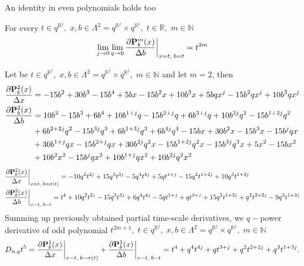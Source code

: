 An identity in even polynomials holds too
\begin{cor}
    For every $t\in q^{\mathbb{R}^j}, \; x,b\in\Lambda^2 = q^{\mathbb{R}^j} \times q^{\mathbb{R}^j}, \; t\in\mathbb{R}, \; m\in\mathbb{N}$
    \[
        \lim \limits_{j \to 0} \lim \limits_{q \to 0} \frac{\partial {\mathbf{P}}\sp{m} \sb{b}(x)}{\Delta b} \bigg |_{x = t, \; b = t}
        = t^{2m}
    \]
\end{cor}

\begin{examp}
    Let be $t\in q^{\mathbb{R}^j}, \; x,b\in\Lambda^2 = q^{\mathbb{R}^j} \times q^{\mathbb{R}^j}, \; m\in\mathbb{N}$ and let $m=2$, then
    \begin{align*}
        \frac{\partial {\mathbf{P}}\sp{2} \sb{b}(x)}{\Delta x}
        &= -15 b^2 + 30 b^3 - 15 b^4 + 5 b x - 15 b^2 x + 10 b^3 x + 5 b q x^j - 15 b^2 q x^j + 10 b^3 q x^j \\
        \frac{\partial {\mathbf{P}}\sp{2} \sb{b}(x)}{\Delta b}
        &= 10 b^2 - 15 b^3 + 6 b^4 + 10 b^{1 + j} q - 15 b^{2 + j} q + 6 b^{3 + j} q + 10 b^{2 j} q^2 - 15 b^{1 + 2 j} q^2 \\
        &+ 6 b^{2 + 2 j} q^2 - 15 b^{3 j} q^3 + 6 b^{1 + 3 j} q^3 + 6 b^{4 j} q^4 - 15 b x + 30 b^2 x - 15 b^3 x - 15 b^j q x \\
        &+ 30 b^{1 + j} q x - 15 b^{2 + j} q x + 30 b^{2 j} q^2 x - 15 b^{1 + 2 j} q^2 x - 15 b^{3 j} q^3 x + 5 x^2 - 15 b x^2 \\
        &+ 10 b^2 x^2 - 15 b^j q x^2 + 10 b^{1 + j} q x^2 + 10 b^{2 j} q^2 x^2
    \end{align*}
    \begin{align*}
        &\frac{\partial {\mathbf{P}}\sp{2} \sb{b}(x)}{\Delta x} \bigg |_{x = t, \; b = \sigma(t)}
        = -10 q^2 t^{2 j} + 15 q^3 t^{3 j} - 5 q^4 t^{4 j} + 5 q t^{1 + j} - 15 q^2 t^{1 + 2 j} + 10 q^3 t^{1 + 3 j} \\
        &\frac{\partial {\mathbf{P}}\sp{2} \sb{b}(x)}{\Delta b} \bigg |_{x = t, \; b = t}
        = t^4 + 10 q^2 t^{2 j} - 15 q^3 t^{3 j} + 6 q^4 t^{4 j} - 5 q t^{1 + j} + q t^{3 + j} + 15 q^2 t^{1 + 2 j}
        + q^2 t^{2 + 2 j} - 9 q^3 t^{1 + 3 j}
    \end{align*}
    Summing up previously obtained partial time-scale derivatives, we $q-$power derivative of odd polynomial
    $t^{2m+1}, \; t\in q^{\mathbb{R}^j}, \; x,b\in\Lambda^2 = q^{\mathbb{R}^j} \times q^{\mathbb{R}^j}, \; m\in\mathbb{N}$
    \[
        D_{n,q} t^{5}
        = \frac{\partial {\mathbf{P}}\sp{1} \sb{b}(x)}{\Delta x} \bigg |_{x = t, \; b = \sigma(t)}
        + \frac{\partial {\mathbf{P}}\sp{1} \sb{b}(x)}{\Delta b} \bigg |_{x = t, \; b = t}
        = t^4 + q^4 t^{4 j} + q t^{3 + j} + q^2 t^{2 + 2 j} + q^3 t^{1 + 3 j}.
    \]
\end{examp}
